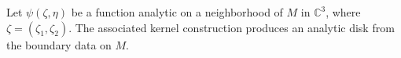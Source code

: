 
Let $\psi(\zeta, \eta)$ be a function analytic on a neighborhood of $M$ in $\mathbb{C}^3$, where $\zeta = (\zeta_1, \zeta_2)$. The associated kernel construction produces an analytic disk from the boundary data on $M$.
